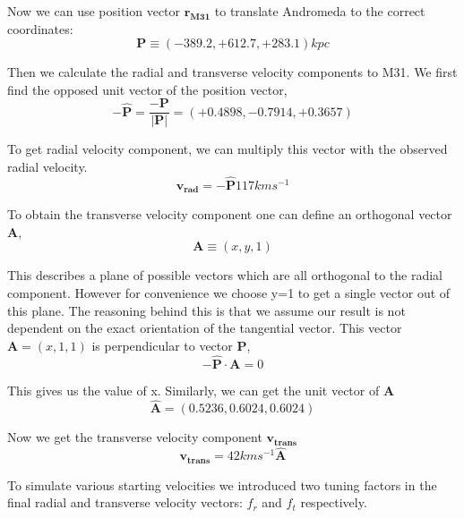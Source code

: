 \documentclass[a4paper,12pt, english]{article}
\begin{document}
\smallskip
Now we can use position vector $ \boldsymbol{r_{M31}} $ to translate Andromeda to the correct coordinates:
\begin{equation}
    \boldsymbol{P} \equiv \left(-389.2,+612.7,+283.1\right) kpc
\end{equation}\par
\smallskip
Then we calculate the radial and transverse velocity components to M31. We first find the opposed unit vector of the position vector,
\begin{equation}
    \boldsymbol{-\hat{P}} = \frac{\boldsymbol{-P}}{|\boldsymbol{P}|} = \left(+0.4898,-0.7914,+0.3657\right)
\end{equation}\par
\smallskip
To get radial velocity component, we can multiply this vector with the observed radial velocity.
\begin{equation}
    \boldsymbol{v_{rad}} = \boldsymbol{-\hat{P}}117 km s^{-1}
\end{equation}\par
\smallskip
To obtain the transverse velocity component one can define an orthogonal vector $ \boldsymbol{A}$, 
\begin{equation}
    \boldsymbol{A} \equiv \left(x,y,1\right)
\end{equation}\par
\smallskip
This describes a plane of possible vectors which are all orthogonal to the radial component. However for convenience we choose y=1 to get a single vector out of this plane. The reasoning behind this is that we assume our result is not dependent on the exact orientation of the tangential vector. This vector $\boldsymbol{A} = \left(x,1,1\right)$ is perpendicular to vector $ \boldsymbol{P} $,
\begin{equation}
    \boldsymbol{-\hat{P}}\cdot\boldsymbol{A} = 0
\end{equation}\par
\smallskip
This gives us the value of x. Similarly, we can get the unit vector of $\boldsymbol{A}$ 
\begin{equation}
    \boldsymbol{\hat{A}} = \left(0.5236,0.6024,0.6024\right)
\end{equation}\par
\smallskip
Now we get the transverse velocity component $ \boldsymbol{v_{trans}} $
\begin{equation}
    \boldsymbol{v_{trans}} = 42 km s^{-1} \boldsymbol{\hat{A}}
\end{equation}\par
\smallskip
To simulate various starting velocities we introduced two tuning factors in the final radial and transverse velocity vectors: \(f_{r}\) and \(f_{t}\) respectively.\par
\smallskip
\end{document}
